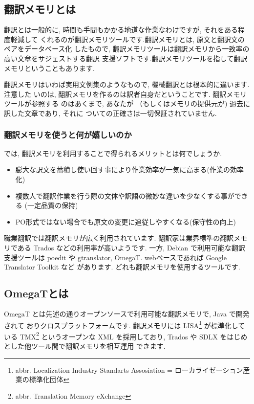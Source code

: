 \documentclass[mingoth,a4paper]{jsarticle}
\begin{document}
\subsection{翻訳メモリとは}
翻訳とは一般的に, 時間も手間もかかる地道な作業なわけですが, それをある程度軽減して
くれるのが翻訳メモリツールです.翻訳メモリとは, 原文と翻訳文のペアをデータベース化
したもので, 翻訳メモリツールは翻訳メモリから一致率の高い文章をサジェストする翻訳
支援ソフトです.翻訳メモリツールを指して翻訳メモリということもあります.

翻訳メモリはいわば実用文例集のようなもので, 機械翻訳とは根本的に違います.注意した
いのは, 翻訳メモリを作るのは訳者自身だということです. 翻訳メモリツールが参照する
のはあくまで, あなたが （もしくはメモリの提供元が) 過去に訳した文章であり, それに
ついての正確さは一切保証されていません.

\subsubsection{翻訳メモリを使うと何が嬉しいのか}
では, 翻訳メモリを利用することで得られるメリットとは何でしょうか.
\begin{itemize}
	\item 膨大な訳文を蓄積し使い回す事により作業効率が一気に高まる(作業の効率化)
	\item 複数人で翻訳作業を行う際の文体や訳語の微妙な違いを少なくする事ができる
	      (一定品質の保持)
	\item PO形式ではない場合でも原文の変更に追従しやすくなる(保守性の向上)
\end{itemize}

職業翻訳では翻訳メモリが広く利用されています. 翻訳家は業界標準の翻訳メモリである
 Trados などの利用率が高いようです. 一方, Debian で利用可能な翻訳支援ツールは
 poedit や gtranslator, OmegaT. webベースであれば Google Translator Toolkit など
があります. どれも翻訳メモリを使用するツールです. 

\subsection{OmegaTとは}
OmegaT とは先述の通りオープンソースで利用可能な翻訳メモリで, Java で開発されて
おりクロスプラットフォームです. 翻訳メモリには LISA\footnote{abbr. Localization 
Industry Standarts Assosiation = ローカライゼーション産業の標準化団体} 
が標準化している TMX\footnote{abbr. Translation Memory eXchange} というオープンな
XML を採用しており, Trados や SDLX をはじめとした他ツール間で翻訳メモリを相互運用
できます.
\end{document}
